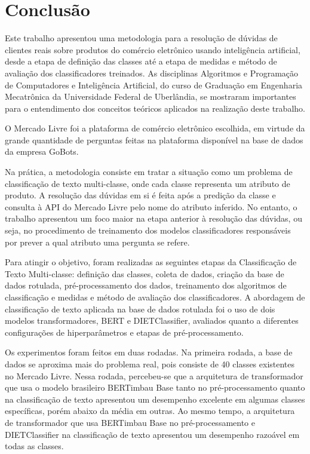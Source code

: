 \chapter[Conclusão]{Conclusão}
\label{cap-conclusao}
Este trabalho apresentou uma metodologia para a resolução de dúvidas de clientes reais sobre produtos do comércio eletrônico usando inteligência artificial, desde a etapa de definição das classes até a etapa de medidas e método de avaliação dos classificadores treinados. As disciplinas Algoritmos e Programação de Computadores e Inteligência Artificial, do curso de Graduação em Engenharia Mecatrônica da Universidade Federal de Uberlândia, se mostraram importantes para o entendimento dos conceitos teóricos aplicados na realização deste trabalho.

O Mercado Livre foi a plataforma de comércio eletrônico escolhida, em virtude da grande quantidade de perguntas feitas na plataforma disponível na base de dados da empresa GoBots.

Na prática, a metodologia consiste em tratar a situação como um problema de classificação de texto multi-classe, onde cada classe representa um atributo de produto. A resolução das dúvidas em si é feita após a predição da classe e consulta à API do Mercado Livre pelo nome do atributo inferido. No entanto, o trabalho apresentou um foco maior na etapa anterior à resolução das dúvidas, ou seja, no procedimento de treinamento dos modelos classificadores responsáveis por prever a qual atributo uma pergunta se refere.

Para atingir o objetivo, foram realizadas as seguintes etapas da Classificação de Texto Multi-classe: definição das classes, coleta de dados, criação da base de dados rotulada, pré-processamento dos dados, treinamento dos algoritmos de classificação e medidas e método de avaliação dos classificadores. A abordagem de classificação de texto aplicada na base de dados rotulada foi o uso de dois modelos transformadores, BERT e DIETClassifier, avaliados quanto a diferentes configurações de hiperparâmetros e etapas de pré-processamento. 

Os experimentos foram feitos em duas rodadas. Na primeira rodada, a base de dados se aproxima mais do problema real, pois consiste de 40 classes existentes no Mercado Livre. Nessa rodada, percebeu-se que a arquitetura de transformador que usa o modelo brasileiro BERTimbau Base tanto no pré-processamento quanto na classificação de texto apresentou um desempenho excelente em algumas classes específicas, porém abaixo da média em outras. Ao mesmo tempo, a arquitetura de transformador que usa BERTimbau Base no pré-processamento e DIETClassifier na classificação de texto apresentou um desempenho razoável em todas as classes.

